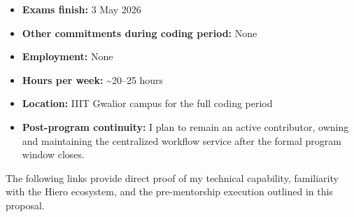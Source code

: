 \documentclass[11pt]{article}
\newcommand{\mainheading}[1]{\par\vspace{10pt}\noindent{\fontsize{15pt}{18pt}\selectfont\textcolor{headingblue}{#1}}
\par\vspace{4pt}}
\begin{document}
\begin{itemize}[leftmargin=18pt,itemsep=4pt,topsep=2pt]
    \item \textbf{Exams finish:} 3 May 2026
    \item \textbf{Other commitments during coding period:} None
    \item \textbf{Employment:} None
    \item \textbf{Hours per week:} \textasciitilde20--25 hours
    \item \textbf{Location:} IIIT Gwalior campus for the full coding period
    \item \textbf{Post-program continuity:} I plan to remain an active contributor, owning and maintaining the centralized workflow service after the formal program window closes.
\end{itemize}

\vspace{10pt}
\mainheading{13. Appendix: Proof of Execution (PRs \& Repositories)}

The following links provide direct proof of my technical capability, familiarity with the Hiero ecosystem, and the pre-mentorship execution outlined in this proposal.
\end{document}
